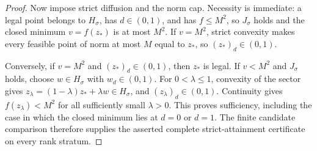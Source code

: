 \documentclass{article}
\begin{document}
\begin{proof}
Now impose strict diffusion and the norm cap.  Necessity is immediate: a legal point belongs to \(H_{\sigma}\), has \(d\in(0,1)\), and has \(f\le M^2\), so \(J_{\sigma}\) holds and the closed minimum \(v=f(z_*)\) is at most \(M^2\).  If \(v=M^2\), strict convexity makes every feasible point of norm at most \(M\) equal to \(z_*\), so \((z_*)_d\in(0,1)\).

Conversely, if \(v=M^2\) and \((z_*)_d\in(0,1)\), then \(z_*\) is legal.  If \(v<M^2\) and \(J_{\sigma}\) holds, choose \(w\in H_{\sigma}\) with \(w_d\in(0,1)\).  For \(0<\lambda\le1\), convexity of the sector gives \(z_{\lambda}=(1-\lambda)z_*+\lambda w\in H_{\sigma}\), and \((z_{\lambda})_d\in(0,1)\).  Continuity gives \(f(z_{\lambda})<M^2\) for all sufficiently small \(\lambda>0\).  This proves sufficiency, including the case in which the closed minimum lies at \(d=0\) or \(d=1\).  The finite candidate comparison therefore supplies the asserted complete strict-attainment certificate on every rank stratum.
\end{proof}
\end{document}
